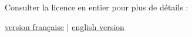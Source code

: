 \bigskip

\begin{center}
    Consulter la licence en entier pour plus de détails :
    
    \href{https://www.etalab.gouv.fr/wp-content/uploads/2017/04/ETALAB-Licence-Ouverte-v2.0.pdf}{version française} | \href{https://www.etalab.gouv.fr/wp-content/uploads/2018/11/open-licence.pdf}{english version} 
\end{center}